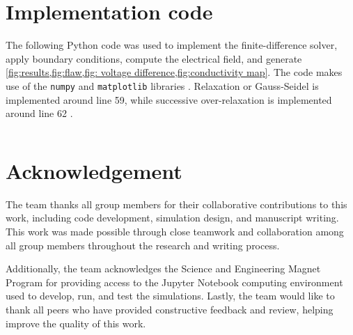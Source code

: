 \documentclass[10pt,journal,twoside]{IEEEtran} %
\begin{document}
\appendix
\section{Implementation code}
The following Python code was used to implement the finite-difference solver, apply boundary conditions, compute the electrical field, and generate \cref{fig:results,fig:flaw,fig: voltage difference,fig:conductivity map}. The code makes use of the \texttt{numpy} and \texttt{matplotlib} libraries \cite{numpy,matplotlib}. Relaxation or Gauss-Seidel is implemented around line 59, while successive over-relaxation is implemented around line 62 \cite{press:1992:numerical}.
\inputminted{python}{figures/main2.py}







\section*{Acknowledgement} %

The team thanks all group members for their collaborative contributions to this work, including code development, simulation design, and manuscript writing. This work was made possible through close teamwork and collaboration among all group members throughout the research and writing process. 

Additionally, the team acknowledges the Science and Engineering Magnet Program for providing access to the Jupyter Notebook computing environment used to develop, run, and test the simulations. Lastly, the team would like to thank all peers who have provided constructive feedback and review, helping improve the quality of this work. 









\end{document}
